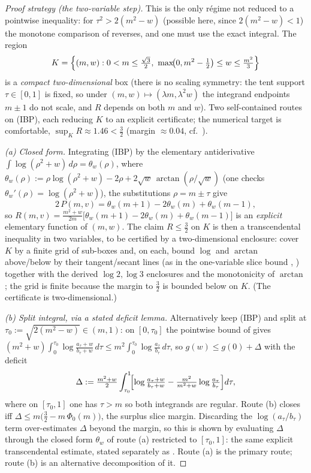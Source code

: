 \begin{proof}[Proof strategy (the two-variable step)]
This is the only régime not reduced to a pointwise inequality: for
$\tau^2>2(m^2-w)$ (possible here, since $2(m^2-w)<1$) the monotone comparison of
 reverses, and one must use the exact integral. The region
\[
  K=\Bigl\{(m,w):0<m\le\tfrac{\sqrt3}2,\ \max\!\bigl(0,m^2-\tfrac12\bigr)\le w\le\tfrac{m^2}3\Bigr\}
\]
is a \emph{compact two-dimensional} box (there is no scaling symmetry: the tent
support $\tau\in[0,1]$ is fixed, so under $(m,w)\mapsto(\lambda m,\lambda^2w)$ the
integrand endpoints $m\pm1$ do not scale, and $R$ depends on both $m$ and $w$). Two self-contained routes on \textup{(IBP)}, each reducing $K$ to an
explicit certificate; the numerical target is comfortable, $\sup_K R\approx1.46<\tfrac32$
(margin $\approx0.04$, cf.\ ).

\emph{(a) Closed form.} Integrating \textup{(IBP)} by the elementary
antiderivative $\int\log(\rho^2+w)\,d\rho=\theta_w(\rho)$, where
$\theta_w(\rho):=\rho\log(\rho^2+w)-2\rho+2\sqrt w\,\arctan(\rho/\sqrt w)$
(one checks $\theta_w'(\rho)=\log(\rho^2+w)$), the substitutions $\rho=m\pm\tau$ give
\[
  2\,P(m,v)=\theta_w(m+1)-2\theta_w(m)+\theta_w(m-1) ,
\]
so $R(m,v)=\tfrac{m^2+w}{2m}\bigl[\theta_w(m+1)-2\theta_w(m)+\theta_w(m-1)\bigr]$ is an
\emph{explicit} elementary function of $(m,w)$. The claim $R\le\tfrac32$ on $K$ is then
a transcendental inequality in two variables, to be certified by a two-dimensional
enclosure: cover $K$ by a finite grid of sub-boxes and, on each, bound $\log$ and
$\arctan$ above/below by their tangent/secant lines (as in the one-variable slice bound
, ) together
with the derived $\log2,\log3$ enclosures and the monotonicity of $\arctan$; the grid is
finite because the margin to $\tfrac32$ is bounded below on $K$. (The certificate is
two-dimensional.)

\emph{(b) Split integral, via a stated deficit lemma.} Alternatively keep
\textup{(IBP)} and split at $\tau_0:=\sqrt{2(m^2-w)}\in(m,1)$: on $[0,\tau_0]$
the pointwise bound of  gives
$(m^2+w)\!\int_0^{\tau_0}\!\log\frac{a_\tau+w}{b_\tau+w}\,d\tau\le m^2\!\int_0^{\tau_0}\!\log\frac{a_\tau}{b_\tau}\,d\tau$,
so $g(w)\le g(0)+\Delta$ with the deficit
\[
  \Delta:=\tfrac{m^2+w}2\int_{\tau_0}^1\!\Bigl[\log\tfrac{a_\tau+w}{b_\tau+w}
      -\tfrac{m^2}{m^2+w}\log\tfrac{a_\tau}{b_\tau}\Bigr]d\tau ,
\]
where on $[\tau_0,1]$ one has $\tau>m$ so both integrands are regular. Route (b) closes
iff $\Delta\le m\bigl(\tfrac32-m\,\Phi_0(m)\bigr)$, the surplus slice margin.
Discarding the $\log(a_\tau/b_\tau)$ term over-estimates $\Delta$ beyond the margin, so
this is shown by evaluating $\Delta$ through the closed form $\theta_w$ of route (a)
restricted to $[\tau_0,1]$: the same explicit transcendental estimate, stated separately
as . Route (a) is the primary route; route (b)
is an alternative decomposition of it.
\end{proof}

